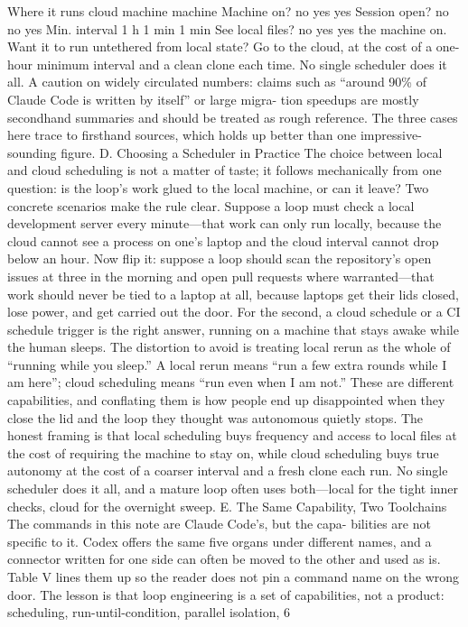 \documentclass[conference]{IEEEtran}
\begin{document}
Where it runs cloud machine machine
Machine on? no yes yes
Session open? no no yes
Min. interval 1 h 1 min 1 min
See local files? no yes yes
the machine on. Want it to run untethered from local state? Go
to the cloud, at the cost of a one-hour minimum interval and a
clean clone each time. No single scheduler does it all.
A caution on widely circulated numbers: claims such as
“around 90\% of Claude Code is written by itself” or large migra-
tion speedups are mostly secondhand summaries and should be
treated as rough reference. The three cases here trace to firsthand
sources, which holds up better than one impressive-sounding
figure.
D. Choosing a Scheduler in Practice
The choice between local and cloud scheduling is not a matter
of taste; it follows mechanically from one question: is the loop’s
work glued to the local machine, or can it leave? Two concrete
scenarios make the rule clear. Suppose a loop must check a
local development server every minute—that work can only run
locally, because the cloud cannot see a process on one’s laptop
and the cloud interval cannot drop below an hour. Now flip it:
suppose a loop should scan the repository’s open issues at three
in the morning and open pull requests where warranted—that
work should never be tied to a laptop at all, because laptops get
their lids closed, lose power, and get carried out the door. For
the second, a cloud schedule or a CI schedule trigger is the right
answer, running on a machine that stays awake while the human
sleeps.
The distortion to avoid is treating local rerun as the whole of
“running while you sleep.” A local rerun means “run a few extra
rounds while I am here”; cloud scheduling means “run even
when I am not.” These are different capabilities, and conflating
them is how people end up disappointed when they close the
lid and the loop they thought was autonomous quietly stops.
The honest framing is that local scheduling buys frequency and
access to local files at the cost of requiring the machine to stay
on, while cloud scheduling buys true autonomy at the cost of a
coarser interval and a fresh clone each run. No single scheduler
does it all, and a mature loop often uses both—local for the tight
inner checks, cloud for the overnight sweep.
E. The Same Capability, Two Toolchains
The commands in this note are Claude Code’s, but the capa-
bilities are not specific to it. Codex offers the same five organs
under different names, and a connector written for one side can
often be moved to the other and used as is. Table V lines them
up so the reader does not pin a command name on the wrong
door. The lesson is that loop engineering is a set of capabilities,
not a product: scheduling, run-until-condition, parallel isolation,
6
\end{document}
